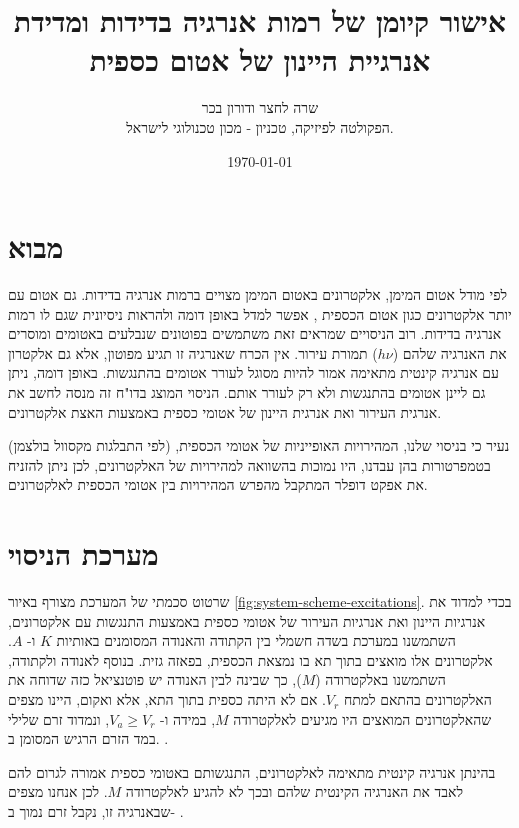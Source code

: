 \documentclass{article}
\title{
אישור קיומן של רמות אנרגיה בדידות ומדידת אנרגיית היינון של אטום כספית
}
\author{
שרה לחצר ודורון בכר \\
הפקולטה לפיזיקה, טכניון - מכון טכנולוגי לישראל.
}
\date{\today}
\newcommand*\circled[1]{\tikz[baseline=(char.base)]{
		            \node[shape=circle,draw,inner sep=1pt] (char) {#1};}}
\begin{document}
\maketitle

\begin{abstract}
\end{abstract}

\section{מבוא}

לפי מודל אטום המימן, אלקטרונים באטום המימן מצויים ברמות אנרגיה בדידות. גם אטום
עם יותר אלקטרונים כגון אטום הכספית , אפשר למדל באופן דומה ולהראות
ניסיונית שגם לו רמות אנרגיה בדידות. רוב הניסויים שמראים זאת משתמשים בפוטונים
שנבלעים באטומים ומוסרים את האנרגיה שלהם
($h \nu $)
תמורת עירור. אין הכרח
שאנרגיה זו תגיע מפוטון, אלא גם אלקטרון עם אנרגיה קינטית מתאימה אמור להיות
מסוגל לעורר אטומים בהתנגשות. באופן דומה, ניתן גם ליינן אטומים בהתנגשות ולא רק
לעורר אותם.
הניסוי המוצג בדו"ח זה מנסה לחשב את אנרגית העירור ואת אנרגית היינון של אטומי כספית באמצעות האצת אלקטרונים. 

נעיר כי בניסוי שלנו, המהירויות האופייניות של אטומי הכספית, (לפי התבלגות מקסוול בולצמן) בטמפרטורות בהן עבדנו, היו נמוכות בהשוואה למהירויות של האלקטרונים, לכן ניתן להזניח את אפקט דופלר המתקבל מהפרש המהירויות בין אטומי הכספית לאלקטרונים.


\section{מערכת הניסוי}

שרטוט סכמתי של המערכת מצורף באיור
\ref{fig:system-scheme-excitations}.
בכדי למדוד את אנרגיות היינון ואת אנרגיות העירור של אטומי כספית באמצעות התנגשות
עם אלקטרונים, השתמשנו במערכת בשדה חשמלי בין הקתודה והאנודה המסומנים באותיות
$K$
ו-
$A$.
אלקטרונים אלו מואצים בתוך תא בו נמצאת הכספית, בפאזה גזית. בנוסף לאנודה
ולקתודה, השתמשנו באלקטרודה 
($M$),
כך שבינה לבין האנודה יש פוטנציאל כזה שדוחה את
האלקטרונים בהתאם למתח
$V_r$.
אם לא היתה כספית בתוך התא, אלא ואקום, היינו מצפים
שהאלקטרונים המואצים היו מגיעים לאלקטרודה
$M$,
במידה ו-
$V_a \ge  V_r$,
ונמדוד
זרם שלילי במד הזרם הרגיש המסומן ב.
\circled{pA}.

בהינתן אנרגיה קינטית מתאימה לאלקטרונים, התנגשותם באטומי כספית אמורה לגרום להם
לאבד את האנרגיה הקינטית שלהם ובכך לא להגיע לאלקטרודה $M$. לכן אנחנו מצפים
שבאנרגיה זו, נקבל זרם נמוך ב-
\circled{pA}.
\end{document}

